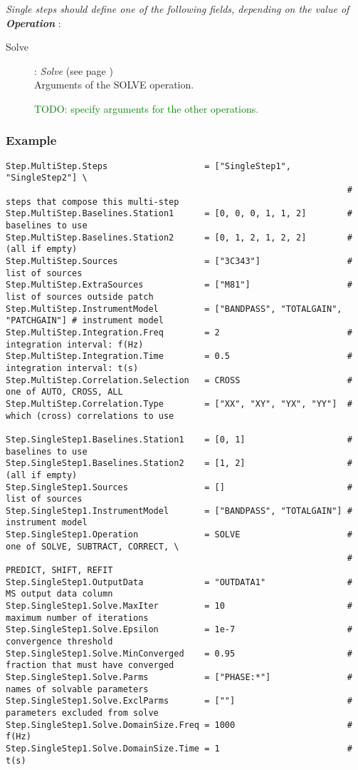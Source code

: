 \documentclass[10pt]{lofar}
\begin{document}
\emph{Single steps should define one of the following fields, depending on the value of \textbf{Operation}} :
\begin{description}
\item [Solve] : \emph{Solve} (see page \pageref{app-solve}) \\
    Arguments of the SOLVE operation. \par
    \textcolor{green}{TODO: specify arguments for the other operations.}
\end{description}

\subsubsection*{Example}
{\footnotesize
\begin{verbatim}
Step.MultiStep.Steps                   = ["SingleStep1", "SingleStep2"] \
                                                                   # steps that compose this multi-step
Step.MultiStep.Baselines.Station1      = [0, 0, 0, 1, 1, 2]        # baselines to use
Step.MultiStep.Baselines.Station2      = [0, 1, 2, 1, 2, 2]        # (all if empty)
Step.MultiStep.Sources                 = ["3C343"]                 # list of sources
Step.MultiStep.ExtraSources            = ["M81"]                   # list of sources outside patch
Step.MultiStep.InstrumentModel         = ["BANDPASS", "TOTALGAIN", "PATCHGAIN"] # instrument model
Step.MultiStep.Integration.Freq        = 2                         # integration interval: f(Hz)
Step.MultiStep.Integration.Time        = 0.5                       # integration interval: t(s)
Step.MultiStep.Correlation.Selection   = CROSS                     # one of AUTO, CROSS, ALL
Step.MultiStep.Correlation.Type        = ["XX", "XY", "YX", "YY"]  # which (cross) correlations to use

Step.SingleStep1.Baselines.Station1    = [0, 1]                    # baselines to use
Step.SingleStep1.Baselines.Station2    = [1, 2]                    # (all if empty)
Step.SingleStep1.Sources               = []                        # list of sources
Step.SingleStep1.InstrumentModel       = ["BANDPASS", "TOTALGAIN"] # instrument model
Step.SingleStep1.Operation             = SOLVE                     # one of SOLVE, SUBTRACT, CORRECT, \
                                                                   # PREDICT, SHIFT, REFIT
Step.SingleStep1.OutputData            = "OUTDATA1"                # MS output data column
Step.SingleStep1.Solve.MaxIter         = 10                        # maximum number of iterations
Step.SingleStep1.Solve.Epsilon         = 1e-7                      # convergence threshold
Step.SingleStep1.Solve.MinConverged    = 0.95                      # fraction that must have converged
Step.SingleStep1.Solve.Parms           = ["PHASE:*"]               # names of solvable parameters
Step.SingleStep1.Solve.ExclParms       = [""]                      # parameters excluded from solve
Step.SingleStep1.Solve.DomainSize.Freq = 1000                      # f(Hz)
Step.SingleStep1.Solve.DomainSize.Time = 1                         # t(s)


\end{verbatim}}
\end{document}
